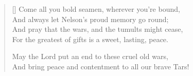 \settowidth{\versewidth}{Come all you bold seamen, wherever you're bound,}
\begin{verse}[\versewidth]
Come all you bold seamen, wherever you're bound,\\
And always let Nelson's proud memory go round;\\
And pray that the wars, and the tumults might cease,\\
For the greatest of gifts is a sweet, lasting, peace.

May the Lord put an end to these cruel old wars,\\
And bring peace and contentment to all our brave Tars!

\end{verse}